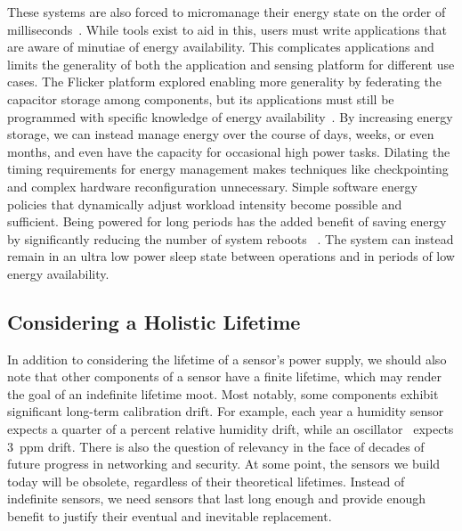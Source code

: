 These systems are also forced to micromanage their energy state
on the order of milliseconds~\cite{luciaIntermittent17}.
While tools exist to aid in this, users must write applications that are
aware of minutiae of energy availability. This complicates
applications and limits the generality of both the application and sensing
platform for different use cases. The Flicker platform explored enabling
more generality by federating the capacitor storage among components, but its
applications must still be programmed with specific knowledge of energy
availability~\cite{hesterFlicker17}.
By increasing energy storage, we can instead manage energy over the course of
days, weeks, or even months, and even have the capacity for occasional high power tasks.
Dilating the timing requirements for energy management makes techniques like
checkpointing and complex hardware reconfiguration unnecessary. Simple software
energy policies that dynamically adjust workload intensity become possible and
sufficient.
Being powered for long periods has the
added benefit of saving energy by significantly reducing the number of system
reboots
~\cite{hesterFlicker17}.
The
system can instead remain in an ultra low power sleep state between operations
and in periods of low energy availability.

\subsection{Considering a Holistic Lifetime}
\label{sec:capacity:holistic}

In addition to considering the lifetime of a sensor's power supply, we should
also note that other components of a sensor have a finite lifetime, which may
render the goal of an indefinite lifetime moot.  Most notably, some components exhibit significant long-term calibration drift. For example, each year a humidity sensor~\cite{si7021} expects a quarter of a percent relative humidity drift, while an oscillator~\cite{txc-oscillator} expects 3~ppm drift.
There is also the question of relevancy in the face of decades of future
progress in networking and security. At some point, the sensors we build today
will be obsolete, regardless of their theoretical lifetimes. Instead of
indefinite sensors, we need sensors that last long enough and provide enough
benefit to justify their eventual and inevitable replacement.
\fi

\section{}
\label{sec:battery}

